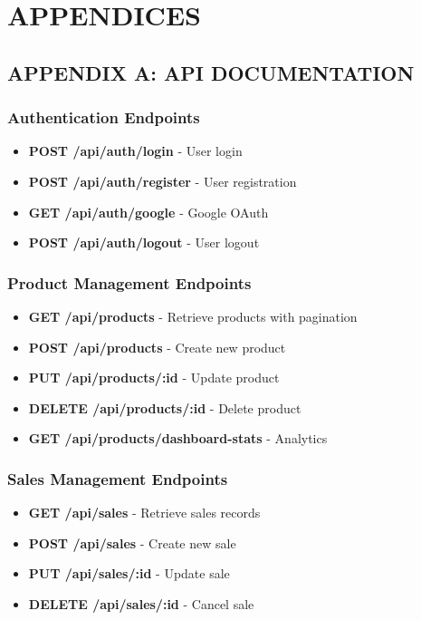 \chapter*{APPENDICES}

\section*{APPENDIX A: API DOCUMENTATION}

\subsection*{Authentication Endpoints}
\begin{itemize}
\item \textbf{POST /api/auth/login} - User login
\item \textbf{POST /api/auth/register} - User registration  
\item \textbf{GET /api/auth/google} - Google OAuth
\item \textbf{POST /api/auth/logout} - User logout
\end{itemize}

\subsection*{Product Management Endpoints}
\begin{itemize}
\item \textbf{GET /api/products} - Retrieve products with pagination
\item \textbf{POST /api/products} - Create new product
\item \textbf{PUT /api/products/:id} - Update product
\item \textbf{DELETE /api/products/:id} - Delete product
\item \textbf{GET /api/products/dashboard-stats} - Analytics
\end{itemize}

\subsection*{Sales Management Endpoints}
\begin{itemize}
\item \textbf{GET /api/sales} - Retrieve sales records
\item \textbf{POST /api/sales} - Create new sale
\item \textbf{PUT /api/sales/:id} - Update sale
\item \textbf{DELETE /api/sales/:id} - Cancel sale
\end{itemize}

